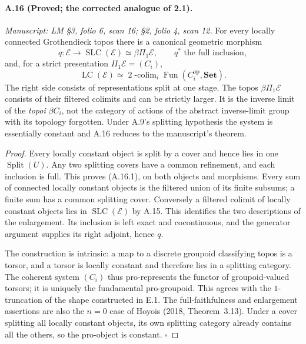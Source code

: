 \paragraph{A.16 (Proved; the corrected analogue of 2.1).}
\textit{Manuscript: LM \S3, folio 6, scan 16; \S2, folio 4, scan 12.}
For every locally connected Grothendieck topos there is a canonical geometric morphism
\[
 q:\mathcal E\longrightarrow\operatorname{SLC}(\mathcal E)
       \simeq\beta\Pi_1\mathcal E,
 \qquad q^*\text{ the full inclusion},
\]
and, for a strict presentation $\Pi_1\mathcal E=(C_i)$,
\[
 \operatorname{LC}(\mathcal E)
   \simeq\mathop{\mathrm{2\!\!\!-colim}}_i
       \operatorname{Fun}(C_i^{\mathrm{op}},\mathbf{Set}).
                                                        \tag{A.16.1}
\]
The right side consists of representations split at one stage. The topos $\beta\Pi_1\mathcal E$ consists of their filtered colimits and can be strictly larger. It is the inverse limit of the \emph{topoi} $\beta C_i$, not the category of actions of the abstract inverse-limit group with its topology forgotten. Under A.9's splitting hypothesis the system is essentially constant and A.16 reduces to the manuscript's theorem.
\begin{proof}
Every locally constant object is split by a cover and hence lies in one $\operatorname{Split}(U)$. Any two splitting covers have a common refinement, and each inclusion is full. This proves (A.16.1), on both objects and morphisms. Every sum of connected locally constant objects is the filtered union of its finite subsums; a finite sum has a common splitting cover. Conversely a filtered colimit of locally constant objects lies in $\operatorname{SLC}(\mathcal E)$ by A.15. This identifies the two descriptions of the enlargement. Its inclusion is left exact and cocontinuous, and the generator argument supplies its right adjoint, hence $q$.

The construction is intrinsic: a map to a discrete groupoid classifying topos is a torsor, and a torsor is locally constant and therefore lies in a splitting category. The coherent system $(C_i)$ thus pro-represents the functor of groupoid-valued torsors; it is uniquely the fundamental pro-groupoid. This agrees with the $1$-truncation of the shape constructed in E.1. The full-faithfulness and enlargement assertions are also the $n=0$ case of Hoyois (2018, Theorem~3.13). Under a cover splitting all locally constant objects, its own splitting category already contains all the others, so the pro-object is constant. \hfill$\square$
\end{proof}

